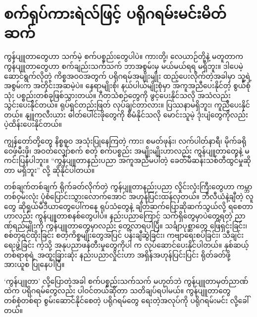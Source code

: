\chapter{စက်ရုပ်ကားရဲလ်ဖြင့် ပရိုဂရမ်းမင်းမိတ်ဆက်} \label{ch:ch01}
ကွန်ပျူတာတွေဟာ သက်မဲ့ စက်ပစ္စည်းတွေပါပဲ။ ကားတို့၊ လေယာဉ်တို့နဲ့ မတူတာက ကွန်ပျူတာတွေဟာ စက်ချည်းသက်သက် ဘာအစွမ်းမှ မယ်မယ်ရရ မရှိဘူး။ ဒါပေမဲ့ ဆောင်ရွက်လိုတဲ့ ကိစ္စအဝဝအတွက် ပရိုဂရမ်အမျိုးမျိုး ထည့်ပေးလိုက်တဲ့အခါမှာ သူ့ရဲ့အစွမ်းက အတိုင်းအဆမဲ့ပဲ။ နေရာမျိုးစုံ၊ နယ်ပါယ်မျိုးစုံမှာ အကူအညီပေးနိုင်တဲ့ စွယ်စုံသုံး ပစ္စည်းတစ်ခုဖြစ်သွားတယ်။ ဂီတသံစဉ်တွေကို ဖွင့်ပေးနိုင်သလို အသံလည်းသွင်းပေးနိုင်တယ်။ ရုပ်ရှင်တည်းဖြတ် လုပ်ချင်တာလား။ ပြဿနာမရှိဘူး၊ ကူညီပေးနိုင်တယ်။ နျူကလီး\allowbreak ယား ဓါတ်ပေါင်းဖိုတွေကို စီမံနိုင်သလို မောင်းသူမဲ့ ဒုံးပျံတွေကိုလည်း ပဲ့ထိန်းပေးနိုင်တယ်။ 

ကျွန်တော်တို့တွေ နိစ္စဓူဝ အသုံးပြုနေကြတဲ့ ကား၊ စမတ်ဖုန်း၊ လက်ပါတ်နာရီ၊ မိုက်ခရိုဝေဖ့်မီးဖို၊ အဝတ်လျှော်စက် စတဲ့ စက်ပစ္စည်း အမျိုးမျိုးဟာလည်း ကွန်ပျူတာတွေနဲ့ မကင်းပြန်ပါဘူး။ “ကွန်ပျူတာနည်းပညာ အကူအညီမပါတဲ့ ခေတ်မီဆန်းသစ်တီထွင်မှုဆိုတာ မရှိဘူး” လို့ ဆိုနိုင်ပါတယ်။

တစ်ချက်တစ်ချက် ရိုက်ခတ်လိုက်တဲ့ ကွန်ပျူတာနည်းပညာ လှိုင်းလုံးကြီးတွေဟာ ကမ္ဘာတစ်ဝှမ်းလုံး ပုံစံပြောင်းသွားလောက်အောင် အဟုန်ပြင်းထန်လှတယ်။ ဘီလီယံနဲ့ချီတဲ့ လူတွေ ဆိုရှယ်မီဒီယာတွေပေါ်ကနေ ရုပ်သံတွေနဲ့ ချိတ်ဆက်ပြောဆိုဆက်သွယ်လို့ ရစေတာဟာလည်း ကွန်ပျူတာစနစ်တွေပါပဲ။  နည်းပညာကြောင့် သက်ရှိတွေမှာပဲတွေ့ရတဲ့ ညာဏ်ရည်မျိုးကို ကွန်ပျူတာတွေမှာလည်း တွေ့လာရပါပြီ။ သင်္ချာပုစ္ဆာတွေ ဖြေရှင်းခြင်း၊ စစ်တုရင်ထိုးခြင်း စတဲ့ကိစ္စမျိုးတွေအပြင် ပန်းချီဆွဲခြင်း၊ ကဗျာရေးစပ်ခြင်း၊ သီချင်းရေးဖွဲ့ခြင်း ကဲ့သို့ အနုပညာဖန်တီးမှုတွေကိုပါ  က လုပ်ဆောင်ပေးနိုင်ပါတယ်။ နှစ်ဆယ့်တစ်ရာစုရဲ့ အထူးခြားဆုံး  နည်းပညာလှိုင်းဟာ အရှိန်အဟုန်ပြင်းပြင်း ရိုတ်ခတ်ဖို့ အားယူစ ပြုနေပါပြီ။

‘ကွန်ပျူတာ’ လို့ပြောတဲ့အခါ စက်ပစ္စည်းသက်သက် မဟုတ်ဘဲ ကွန်ပျူတာမှတ်ညာဏ်ထဲက ပရိုဂရမ်တွေလည်း ပါဝင်တယ်ဆိုတာ သတိချပ်ရပါမယ်။ ကွန်ပျူတာတွေ တစ်စုံတစ်ရာ စွမ်းဆောင်နိုင်စေတဲ့  ပရိုဂရမ်တွေ ရေးတဲ့အလုပ်ကို ပရိုဂရမ်းမင်း  လို့ခေါ်တယ်။

